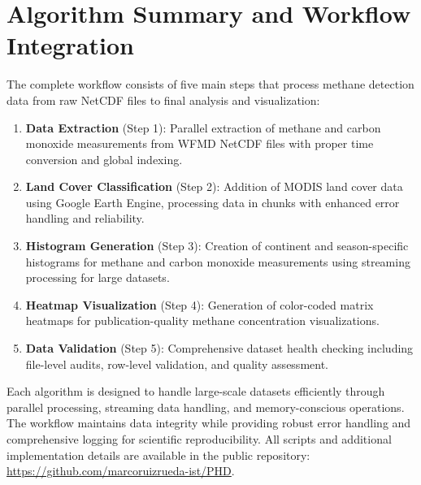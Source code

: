 \section{Algorithm Summary and Workflow Integration}
\label{sec:appendixB_summary}

The complete workflow consists of five main steps that process methane detection data from raw NetCDF files to final analysis and visualization:

\begin{enumerate}
    \item \textbf{Data Extraction} (Step 1): Parallel extraction of methane and carbon monoxide measurements from WFMD NetCDF files with proper time conversion and global indexing.
    
    \item \textbf{Land Cover Classification} (Step 2): Addition of MODIS land cover data using Google Earth Engine, processing data in chunks with enhanced error handling and reliability.
    
    \item \textbf{Histogram Generation} (Step 3): Creation of continent and season-specific histograms for methane and carbon monoxide measurements using streaming processing for large datasets.
    
    \item \textbf{Heatmap Visualization} (Step 4): Generation of color-coded matrix heatmaps for publication-quality methane concentration visualizations.
    
    \item \textbf{Data Validation} (Step 5): Comprehensive dataset health checking including file-level audits, row-level validation, and quality assessment.
\end{enumerate}

Each algorithm is designed to handle large-scale datasets efficiently through parallel processing, streaming data handling, and memory-conscious operations. The workflow maintains data integrity while providing robust error handling and comprehensive logging for scientific reproducibility. All scripts and additional implementation details are available in the public repository: \url{https://github.com/marcoruizrueda-ist/PHD}.
